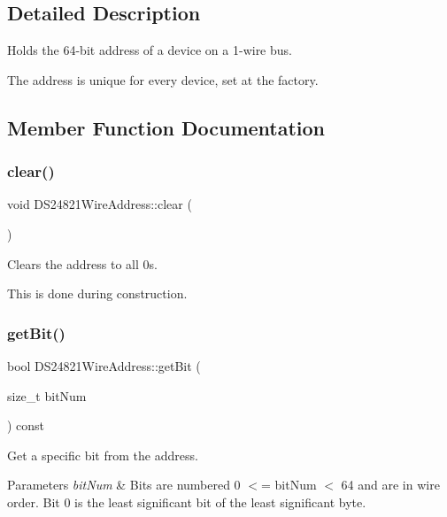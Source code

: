 \subsection{Detailed Description}
Holds the 64-\/bit address of a device on a 1-\/wire bus. 

The address is unique for every device, set at the factory. 

\subsection{Member Function Documentation}
\mbox{\label{class_d_s24821_wire_address_ae42958bfdb76f2dbeba7e6b27f41cafa}} 
\subsubsection{\texorpdfstring{clear()}{clear()}}
{\footnotesize\ttfamily void D\+S24821\+Wire\+Address\+::clear (\begin{DoxyParamCaption}{ }\end{DoxyParamCaption})}



Clears the address to all 0s. 

This is done during construction. \mbox{\label{class_d_s24821_wire_address_ae4cb62921b014f1d886ad032329a5b1f}} 
\subsubsection{\texorpdfstring{get\+Bit()}{getBit()}}
{\footnotesize\ttfamily bool D\+S24821\+Wire\+Address\+::get\+Bit (\begin{DoxyParamCaption}\item[{size\+\_\+t}]{bit\+Num }\end{DoxyParamCaption}) const}



Get a specific bit from the address. 


\begin{DoxyParams}{Parameters}
{\em bit\+Num} & Bits are numbered 0 $<$= bit\+Num $<$ 64 and are in wire order. Bit 0 is the least significant bit of the least significant byte. \\
\hline
\end{DoxyParams}
\mbox{\label{class_d_s24821_wire_address_a1e9409166280dc3a78011698d3c98bc5}} 
